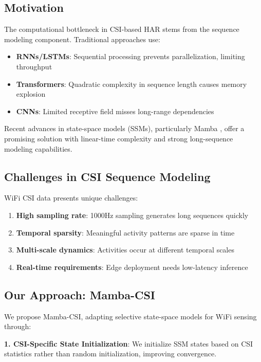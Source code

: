 \documentclass[10pt,conference]{IEEEtran}
\begin{document}
\subsection{Motivation}

The computational bottleneck in CSI-based HAR stems from the sequence modeling component. Traditional approaches use:
\begin{itemize}
    \item \textbf{RNNs/LSTMs}: Sequential processing prevents parallelization, limiting throughput
    \item \textbf{Transformers}: Quadratic complexity in sequence length causes memory explosion
    \item \textbf{CNNs}: Limited receptive field misses long-range dependencies
\end{itemize}

Recent advances in state-space models (SSMs), particularly Mamba \cite{gu2023mamba}, offer a promising solution with linear-time complexity and strong long-sequence modeling capabilities.

\subsection{Challenges in CSI Sequence Modeling}

WiFi CSI data presents unique challenges:
\begin{enumerate}
    \item \textbf{High sampling rate}: 1000Hz sampling generates long sequences quickly
    \item \textbf{Temporal sparsity}: Meaningful activity patterns are sparse in time
    \item \textbf{Multi-scale dynamics}: Activities occur at different temporal scales
    \item \textbf{Real-time requirements}: Edge deployment needs low-latency inference
\end{enumerate}

\subsection{Our Approach: Mamba-CSI}

We propose Mamba-CSI, adapting selective state-space models for WiFi sensing through:

\textbf{1. CSI-Specific State Initialization}: We initialize SSM states based on CSI statistics rather than random initialization, improving convergence.
\end{document}
